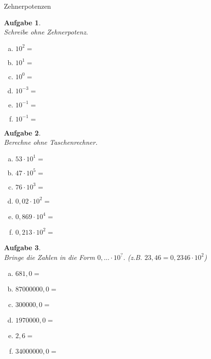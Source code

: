 \documentclass[12pt,fleqn]{article}
\theoremstyle{aufg}
\newtheorem{aufgabe}{Aufgabe}
\theoremstyle{bsp}
\begin{document}
 
    \begin{flushleft}
\begin{center}Zehnerpotenzen\end{center}\begin{aufgabe} ~ \\ 
Schreibe ohne Zehnerpotenz. \\ 
\begin{multicols}{3} 
\begin{enumerate}[a)] 
\item 
$10^{2}=$
\item 
$10^{1}=$
\item 
$10^{0}=$
\item 
$10^{-3}=$
\item 
$10^{-1}=$
\item 
$10^{-1}=$
\end{enumerate} 
\end{multicols} 
\end{aufgabe} 
\begin{aufgabe} ~ \\ 
Berechne ohne Taschenrechner. \\ 
\begin{multicols}{3} 
\begin{enumerate}[a)] 
\item 
$53\cdot10^{1}=$
\item 
$47\cdot10^{5}=$
\item 
$76\cdot10^{3}=$
\item 
$0,02\cdot10^{2}=$
\item 
$0,869\cdot10^{4}=$
\item 
$0,213\cdot10^{2}=$
\end{enumerate} 
\end{multicols} 
\end{aufgabe} 
\begin{aufgabe} ~ \\ 
Bringe die Zahlen in die Form $0,... \cdot 10^{?}$. (z.B. $23,46 = 0,2346 \cdot 10^2$) \\ 
\begin{multicols}{3} 
\begin{enumerate}[a)] 
\item 
$681,0=$
\item 
$87000000,0=$
\item 
$300000,0=$
\item 
$1970000,0=$
\item 
$2,6=$
\item 
$34000000,0=$
\end{enumerate} 

\end{multicols}
\end{aufgabe}
\end{flushleft}
\end{document}
